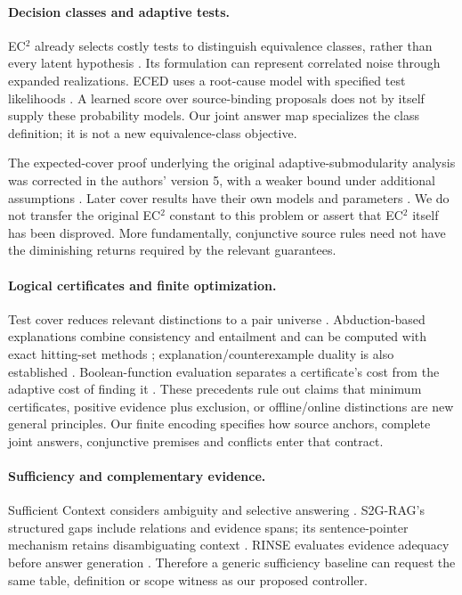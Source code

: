 \paragraph{Decision classes and adaptive tests.}
EC$^2$ already selects costly tests to distinguish equivalence classes, rather
than every latent hypothesis \citep{golovin2010ec2}. Its formulation can represent
correlated noise through expanded realizations. ECED uses a root-cause model
with specified test likelihoods \citep{chen2017eced}. A learned score over
source-binding proposals does not by itself supply these probability models.
Our joint answer map specializes the class definition; it is not a new
equivalence-class objective.

The expected-cover proof underlying the original adaptive-submodularity
analysis was corrected in the authors' version 5, with a weaker bound under
additional assumptions \citep{golovin2011adaptive}. Later cover results have
their own models and parameters
\citep{esfandiari2021adaptivity,hellerstein2021tight}. We do not transfer the
original EC$^2$ constant to this problem or assert that EC$^2$ itself has been
disproved. More fundamentally, conjunctive source rules need not have the
diminishing returns required by the relevant guarantees.

\paragraph{Logical certificates and finite optimization.}
Test cover reduces relevant distinctions to a pair universe
\citep{debontridder2003testcover}. Abduction-based explanations combine
consistency and entailment and can be computed with exact hitting-set methods
\citep{ignatiev2019abduction}; explanation/counterexample duality is also
established \citep{ignatiev2019duality}. Boolean-function evaluation separates
a certificate's cost from the adaptive cost of finding it
\citep{deshpande2014sbfe}. These precedents rule out claims that minimum
certificates, positive evidence plus exclusion, or offline/online distinctions
are new general principles. Our finite encoding specifies how source anchors,
complete joint answers, conjunctive premises and conflicts enter that contract.

\paragraph{Sufficiency and complementary evidence.}
Sufficient Context considers ambiguity and selective answering
\citep{joren2025sufficient}. S2G-RAG's structured gaps include relations and
evidence spans; its sentence-pointer mechanism retains disambiguating context
\citep{li2026s2g}. RINSE evaluates evidence adequacy before answer generation
\citep{chen2026rinse}. Therefore a generic sufficiency baseline can request the
same table, definition or scope witness as our proposed controller.


